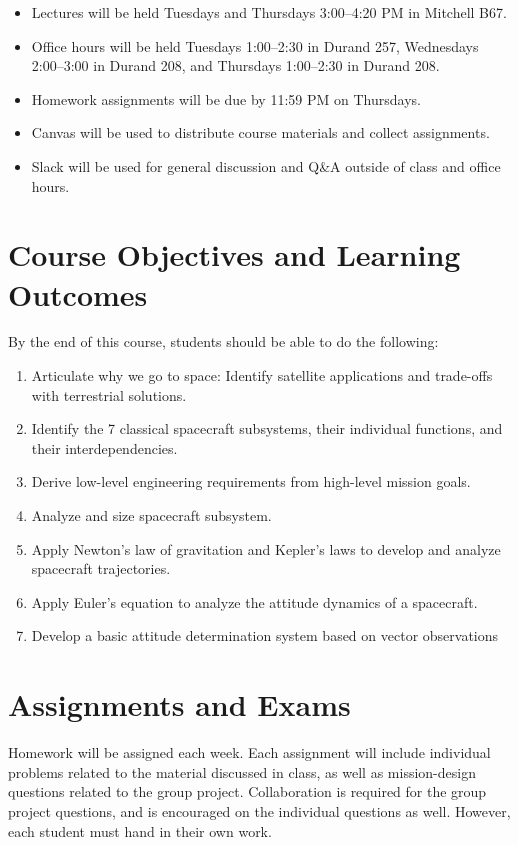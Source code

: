 \documentclass[11pt,letterpaper]{article}
\begin{document}
\begin{itemize}
	\item Lectures will be held Tuesdays and Thursdays 3:00--4:20 PM in Mitchell B67.
	\item Office hours will be held Tuesdays 1:00--2:30 in Durand 257, Wednesdays 2:00--3:00 in Durand 208, and Thursdays 1:00--2:30 in Durand 208.
	\item Homework assignments will be due by 11:59 PM on Thursdays.
	\item Canvas will be used to distribute course materials and collect assignments.
	\item Slack will be used for general discussion and Q\&A outside of class and office hours.
\end{itemize}

\section*{Course Objectives and Learning Outcomes}
By the end of this course, students should be able to do the following:
\begin{enumerate}
	\item Articulate why we go to space: Identify satellite applications and trade-offs with terrestrial solutions.
	\item Identify the 7 classical spacecraft subsystems, their individual functions, and their interdependencies.
	\item Derive low-level engineering requirements from high-level mission goals.
	\item Analyze and size spacecraft subsystem.
	\item Apply Newton's law of gravitation and Kepler's laws to develop and analyze spacecraft trajectories.
	\item Apply Euler's equation to analyze the attitude dynamics of a spacecraft.
	\item Develop a basic attitude determination system based on vector observations
	
\end{enumerate}

\section*{Assignments and Exams}

Homework will be assigned each week. Each assignment will include individual problems related to the material discussed in class, as well as mission-design questions related to the group project. Collaboration is required for the group project questions, and is encouraged on the individual questions as well. However, each student must hand in their own work.
\end{document}
